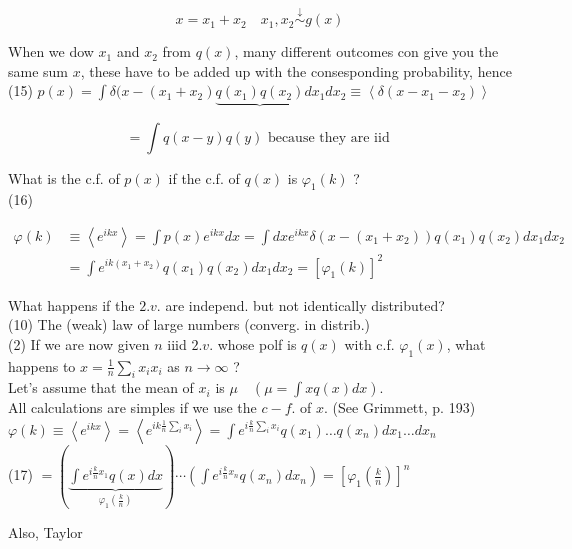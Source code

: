 \documentclass[10pt]{article}
\begin{document}
$$
x=x_{1}+x_{2} \quad x_{1}, x_{2} \stackrel{\downarrow}{\sim} g(x)
$$

When we dow $x_{1}$ and $x_{2}$ from $q(x)$, many different outcomes con give you the same sum $x$, these have to be added up with the consesponding probability, hence\\
(15) $p(x)=\int \delta(x-\left(x_{1}+x_{2}\right) \underbrace{q\left(x_{1}\right) q\left(x_{2}\right)} d x_{1} d x_{2} \equiv\left\langle\delta\left(x-x_{1}-x_{2}\right)\right\rangle$

$$
=\int q(x-y) q(y) \text { because they are iid }
$$

What is the c.f. of $p(x)$ if the c.f. of $q(x)$ is $\varphi_{1}(k)$ ?\\
(16)

$$
\begin{aligned}
\varphi(k) & \equiv\left\langle e^{i k x}\right\rangle=\int p(x) e^{i k x} d x=\int d x e^{i k x} \delta\left(x-\left(x_{1}+x_{2}\right)\right) q\left(x_{1}\right) q\left(x_{2}\right) d x_{1} d x_{2} \\
& =\int e^{i k\left(x_{1}+x_{2}\right)} q\left(x_{1}\right) q\left(x_{2}\right) d x_{1} d x_{2}=\left[\varphi_{1}(k)\right]^{2}
\end{aligned}
$$

What happens if the $2 . v$. are independ. but not identically distributed?\\
(10) The (weak) law of large numbers (converg. in distrib.)\\
(2) If we are now given $n$ iiid $2 . v$. whose polf is $q(x)$ with c.f. $\varphi_{1}(x)$, what happens to $x=\frac{1}{n} \sum_{i} x_{i} x_{i}$ as $n \rightarrow \infty$ ?\\
Let's assume that the mean of $x_{i}$ is $\mu \quad\left(\mu=\int x q(x) d x\right)$.\\
All calculations are simples if we use the $c-f$. of $x$. (See Grimmett, p. 193)\\
$\varphi(k) \equiv\left\langle e^{i k x}\right\rangle=\left\langle e^{i k \frac{1}{n} \sum_{i} x_{i}}\right\rangle=\int e^{i \frac{k}{n} \sum_{i} x_{i}} q\left(x_{1}\right) \ldots q\left(x_{n}\right) d x_{1} \ldots d x_{n}$\\
(17) $=(\underbrace{\int e^{i \frac{k}{n} x_{1}} q(x) d x}_{\varphi_{1}\left(\frac{k}{n}\right)}) \cdots\left(\int e^{i \frac{k}{n} x_{n}} q\left(x_{n}\right) d x_{n}\right)=\left[\varphi_{1}\left(\frac{k}{n}\right)\right]^{n}$

Also, Taylor
\end{document}
